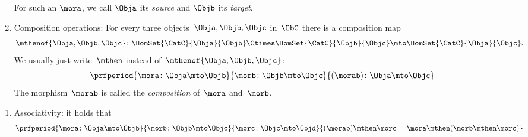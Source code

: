 \begin{ctdefinition}[Semicategory]
\begin{body}
\begin{enumerate}
                  For such an $\mora$, we call $\Obja$ its \emph{source} and $\Objb$ its \emph{target}.
            \item Composition operations: For every three objects~$\Obja,\Objb,\Objc$ in~$\ObC$ there is a composition map
                  \begin{equation}
                      \mthenof{\Obja,\Objb,\Objc}\colon \HomSet{\CatC}{\Obja}{\Objb} \Ctimes \HomSet{\CatC}{\Objb}{\Objc}\mto \HomSet{\CatC}{\Obja}{\Objc}.
                  \end{equation}
                  We usually just write~$\mthen$ instead of~$\mthenof{\Obja,\Objb,\Objc}$:
                  \begin{equation}
                      \prfperiod{
                          \mora \colon \Obja \mto \Objb
                      }{
                          \morb\colon \Objb \mto \Objc
                      }{
                          (\morab )\colon \Obja \mto \Objc
                      }
                  \end{equation}
                  The morphism~$\morab$ is called the \emph{composition} of~$\mora$ and~$\morb$.
        \end{enumerate}
        \condit
        \begin{enumerate}
            \item Associativity: it holds that
                  \begin{equation}
                      \prfperiod{
                          \mora\colon \Obja \mto \Objb
                      }{
                          \morb\colon \Objb \mto \Objc
                      }{
                          \morc\colon \Objc \mto \Objd
                      }{
                          (\morab)
                          \mthen \morc= \mora \mthen (\morb \mthen \morc)
                      }
                  \end{equation}
        \end{enumerate}
    \end{body}
\end{ctdefinition}

